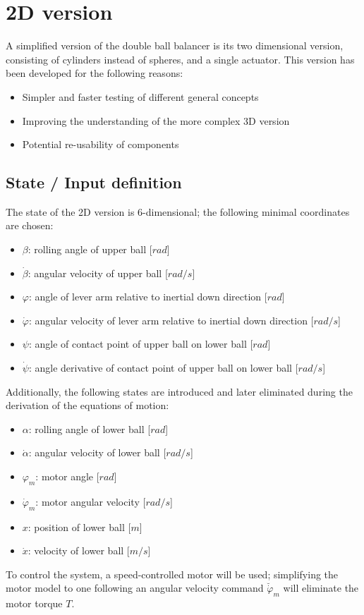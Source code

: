 \documentclass{article}
\begin{document}
\section{2D version}
A simplified version of the double ball balancer is its two dimensional version, consisting of cylinders instead of spheres, and a single actuator.
This version has been developed for the following reasons:
\begin{itemize}
	\item Simpler and faster testing of different general concepts
	\item Improving the understanding of the more complex 3D version
	\item Potential re-usability of components
\end{itemize}

\subsection{State / Input definition}
The state of the 2D version is 6-dimensional; the following minimal coordinates are chosen:
\begin{itemize}
	\item $\beta$: rolling angle of upper ball [$rad$]
	\item $\dot{\beta}$: angular velocity of upper ball [$rad/s$]
	\item $\varphi$: angle of lever arm relative to inertial down direction [$rad$]
	\item $\dot{\varphi}$: angular velocity of lever arm relative to inertial down direction [$rad/s$]
	\item $\psi$: angle of contact point of upper ball on lower ball [$rad$]
	\item $\dot{\psi}$: angle derivative of contact point of upper ball on lower ball [$rad/s$]
\end{itemize}
Additionally, the following states are introduced and later eliminated during the derivation of the equations of motion:
\begin{itemize}
	\item $\alpha$: rolling angle of lower ball [$rad$]
	\item $\dot{\alpha}$: angular velocity of lower ball [$rad/s$]
	\item $\varphi_m$: motor angle [$rad$]
	\item $\dot{\varphi}_m$: motor angular velocity [$rad/s$]
	\item $x$: position of lower ball [$m$]
	\item $\dot{x}$: velocity  of lower ball [$m/s$]
\end{itemize}
To control the system, a speed-controlled motor will be used; simplifying the motor model to one following an angular velocity command $\breve{\dot{\varphi}}_m$ will eliminate the motor torque $T$.
\end{document}
